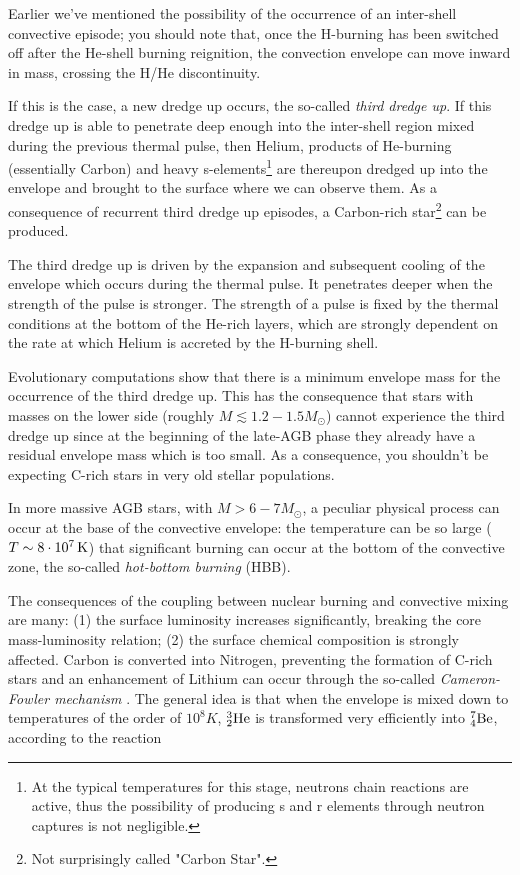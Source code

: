 \par Earlier we've mentioned the possibility of the occurrence of an inter-shell convective episode; you should note that, once the H-burning has been switched off after the He-shell burning reignition, the convection envelope can move inward in mass, crossing the H/He discontinuity.
\par If this is the case, a new dredge up occurs, the so-called \emph{third dredge up}. If this dredge up is able to penetrate deep enough into the inter-shell region mixed during the previous thermal pulse, then Helium, products of He-burning (essentially Carbon) and heavy s-elements\footnote{At the typical temperatures for this stage, neutrons chain reactions are active, thus the possibility of producing s and r elements through neutron captures is not negligible.} are thereupon dredged up into the envelope and brought to the surface where we can observe them. As a consequence of recurrent third dredge up episodes, a Carbon-rich star\footnote{Not surprisingly called "Carbon Star".} can be produced.
\par The third dredge up is driven by the expansion and subsequent cooling of the envelope which occurs during the thermal pulse. It penetrates deeper when the strength of the pulse is stronger. The strength of a pulse is fixed by the thermal conditions at the bottom of the He-rich layers, which are strongly dependent on the rate at which Helium is accreted by the H-burning shell. 
\par Evolutionary computations show that there is a minimum envelope mass for the occurrence of the third dredge up. This has the consequence that stars with masses on the lower side (roughly $M \lesssim 1.2-1.5M_{\odot}$) cannot experience the third dredge up since at the beginning of the late-AGB phase they already have a residual envelope mass which is too small. As a consequence, you shouldn't be expecting C-rich stars in very old stellar populations.
\par In more massive AGB stars, with $M> 6-7M_{\odot}$, a peculiar physical process can occur at the base of the convective envelope: the temperature can be so large ($T \sim 8\power{10}{7}\unit{K}$) that significant burning can occur at the bottom of the convective zone, the so-called \emph{hot-bottom burning} (HBB).
\par The consequences of the coupling between nuclear burning and convective mixing are many: (1) the surface luminosity increases significantly, breaking the core mass-luminosity relation; (2) the surface chemical composition is strongly affected. Carbon is converted into Nitrogen, preventing the formation of C-rich stars and an enhancement of Lithium can occur through the so-called \emph{Cameron-Fowler mechanism} \cite{1971ApJ...164..111C}. The general idea is that when the envelope is mixed down to temperatures of the order of $10^{8}\unit{K}$, $\element{He}{3}{2}$ is transformed very efficiently into $\element{Be}{7}{4}$, according to the reaction
